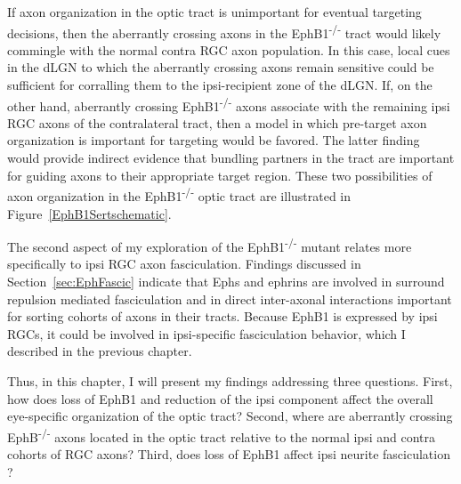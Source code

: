 If axon organization in the optic tract is unimportant for eventual targeting decisions, then the aberrantly crossing axons in the EphB1\textsuperscript{-/-} tract would likely commingle with the normal contra RGC axon population.
In this case, local cues in the dLGN to which the aberrantly crossing axons remain sensitive could be sufficient for corralling them to the ipsi-recipient zone of the dLGN.
If, on the other hand, aberrantly crossing EphB1\textsuperscript{-/-} axons associate with the remaining ipsi RGC axons of the contralateral tract, then a model in which pre-target axon organization is important for targeting would be favored.
The latter finding would provide indirect evidence that bundling partners in the tract are important for guiding axons to their appropriate target region.
These two possibilities of axon organization in the EphB1\textsuperscript{-/-} optic tract are illustrated in Figure~\ref{EphB1Sertschematic}.

The second aspect of my exploration of the EphB1\textsuperscript{-/-} mutant relates more specifically to ipsi RGC axon fasciculation.
Findings discussed in Section~\ref{sec:EphFascic} indicate that Ephs and ephrins are involved in surround repulsion mediated fasciculation and in direct inter-axonal interactions important for sorting cohorts of axons in their tracts.
Because EphB1 is expressed by ipsi RGCs, it could be involved in ipsi-specific fasciculation behavior, which I described \invitro{} in the previous chapter.

Thus, in this chapter, I will present my findings addressing three questions.
First, how does loss of EphB1 and reduction of the ipsi component affect the overall eye-specific organization of the optic tract?
Second, where are aberrantly crossing EphB\textsuperscript{-/-} axons located in the optic tract relative to the normal ipsi and contra cohorts of RGC axons?
Third, does loss of EphB1 affect ipsi neurite fasciculation \invitro{}?